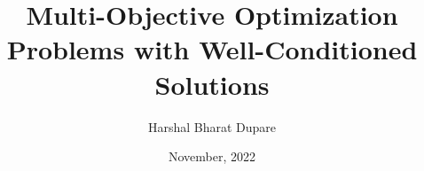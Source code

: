 \documentclass[12pt,a4paper,twoside]{iitgthesis}%
\begin{document}
\title{Multi-Objective Optimization Problems with Well-Conditioned Solutions}
\author{Harshal Bharat Dupare}
\date{November, 2022}
\maketitle





\begin{romanpages}



%



\tableofcontents
\end{romanpages}




% 
% 
% 
% 

%




% 




\renewcommand{\bibname}{References}

\end{document}
